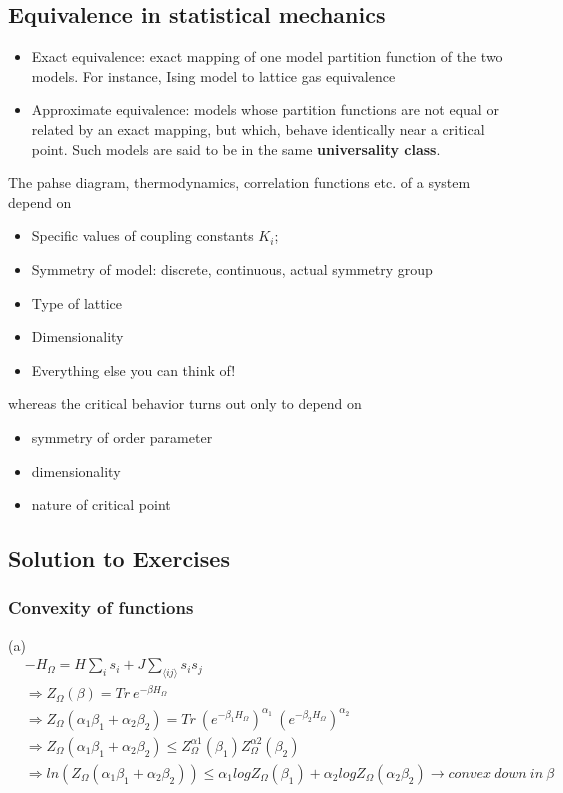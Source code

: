 \documentclass[12pt,titlepage]{article}
\numberwithin{equation}{section}
\begin{document}
\subsection{Equivalence in statistical mechanics}
\begin{itemize}
    \item Exact equivalence: exact mapping of one model partition function of the two models. For instance, Ising model to lattice gas equivalence
    \item Approximate equivalence: models whose partition functions are not equal or related by an exact mapping, but which, behave identically near a critical point. Such models are said to be in the same \textbf{universality class}.
\end{itemize}
The pahse diagram, thermodynamics, correlation functions etc. of a system depend on 
\begin{itemize}
    \item Specific values of coupling constants $K_i$;
    \item Symmetry of model: discrete, continuous, actual symmetry group
    \item Type of lattice
    \item Dimensionality
    \item Everything else you can think of!
\end{itemize}
whereas the critical behavior turns out only to depend on
\begin{itemize}
    \item symmetry of order parameter
    \item dimensionality
    \item nature of critical point
\end{itemize}

\subsection{Solution to Exercises}
\subsubsection{Convexity of functions}
(a)
\begin{align*}
& -H_{\Omega } =H\sum _{i} s_{i} +J\sum _{\langle ij\rangle } s_{i} s_{j}\\
&\Rightarrow Z_{\Omega }( \beta ) =Tr\ e^{-\beta H_{\Omega }}\\
&\Rightarrow Z_{\Omega }( \alpha _{1} \beta _{1} +\alpha _{2} \beta _{2}) =Tr\ \left( e^{-\beta _{1} H_{\Omega }}\right)^{\alpha _{1}} \ \left( e^{-\beta _{2} H_{\Omega }}\right)^{\alpha _{2}}\\
&\Rightarrow Z_{\Omega }( \alpha _{1} \beta _{1} +\alpha _{2} \beta _{2}) \leq Z^{\alpha 1}_{\Omega }( \beta _{1}) Z^{\alpha 2}_{\Omega }( \beta _{2})\\
&\Rightarrow ln( Z_{\Omega }( \alpha _{1} \beta _{1} +\alpha _{2} \beta _{2})) \leq \alpha _{1} logZ_{\Omega }( \beta _{1}) +\alpha _{2} logZ_{\Omega }( \alpha _{2} \beta _{2})\rightarrow convex\ down\ in\ \beta \\
\end{align*}
\end{document}
